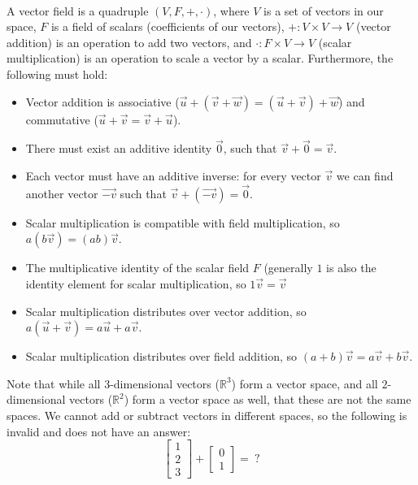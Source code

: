 \begin{definition}\mbox{}\\
  A vector field is a quadruple $(V,F,+,\cdot)$, where $V$ is a set of vectors in our space, $F$ is a field of scalars (coefficients of our vectors), $+ : V \times V \to V$ (vector addition) is an operation to add two vectors, and $\cdot : F \times V \to V$ (scalar multiplication) is an operation to scale a vector by a scalar. Furthermore, the following must hold:
  \begin{itemize}
    \item Vector addition is associative ($\vec u + (\vec v + \vec w) = (\vec u + \vec v) + \vec w$) and commutative ($\vec{u} + \vec{v} = \vec{v} + \vec{u}$).
    \item There must exist an additive identity $\vec 0$, such that $\vec{v} + \vec{0} = \vec{v}$.
    \item Each vector must have an additive inverse: for every vector $\vec v$ we can find another vector $\vec{-v}$ such that $\vec v + (\vec{-v}) = \vec 0$.
    \item Scalar multiplication is compatible with field multiplication, so $a(b\vec v) = (ab)\vec v$.
    \item The multiplicative identity of the scalar field $F$ (generally $1$ is also the identity element for scalar multiplication, so $1 \vec v = \vec v$
    \item Scalar multiplication distributes over vector addition, so $a(\vec u + \vec v) = a\vec u + a\vec v$.
    \item Scalar multiplication distributes over field addition, so $(a+b)\vec v = a\vec v + b\vec v$.
  \end{itemize}\label{def:vecspace}
\end{definition}

Note that while all $3$-dimensional vectors ($\mathbb{R}^3$) form a vector space, and all $2$-dimensional vectors ($\mathbb{R}^2$) form a vector space as well, that these are not the same spaces. We cannot add or subtract vectors in different spaces, so the following is invalid and does not have an answer:
$$\begin{bmatrix}1\\2\\3\end{bmatrix} + \begin{bmatrix}0\\1\end{bmatrix} =\ ?$$

